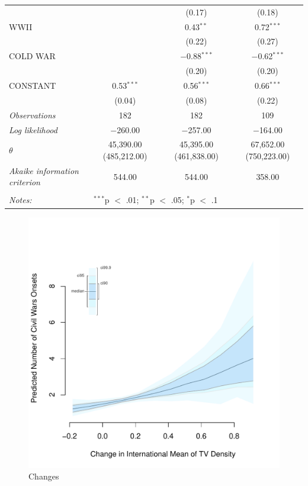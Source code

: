 \documentclass[11pt,article,oneside]{memoir}
\makeatletter
\def\maxwidth{\ifdim\Gin@nat@width>\linewidth\linewidth
\else\Gin@nat@width\fi}
\let\Oldincludegraphics\includegraphics
\renewcommand{\includegraphics}[1]{\Oldincludegraphics[width=\maxwidth]{#1}}
\makeatother
\begin{document}
\begin{table}[!htbp]
\begin{tabular}{@{\extracolsep{5pt}}lccc}
  &  & (0.17) & (0.18) \\ 
  WWII &  & 0.43$^{**}$ & 0.72$^{***}$ \\ 
  &  & (0.22) & (0.27) \\ 
  COLD WAR &  & $-$0.88$^{***}$ & $-$0.62$^{***}$ \\ 
  &  & (0.20) & (0.20) \\ 
  CONSTANT & 0.53$^{***}$ & 0.56$^{***}$ & 0.66$^{***}$ \\ 
  & (0.04) & (0.08) & (0.22) \\ 
 \textit{Observations} & 182 & 182 & 109 \\ 
\textit{Log likelihood} & $-$260.00 & $-$257.00 & $-$164.00 \\ 
$\theta$ & 45,390.00  (485,212.00) & 45,395.00  (461,838.00) & 67,652.00  (750,223.00) \\ 
\textit{Akaike information criterion} & 544.00 & 544.00 & 358.00 \\ 
\hline \\[-1.8ex] 
\textit{Notes:} & \multicolumn{3}{l}{$^{***}$p $<$ .01; $^{**}$p $<$ .05; $^{*}$p $<$ .1} \\ 
\end{tabular} 
\end{table}

\clearpage

\begin{figure} 
\includegraphics{figure/dtv_effect.pdf} 
\caption{Changes} 
\label{myFigur} 
\end{figure}
\end{document}
